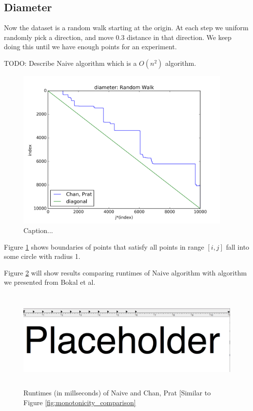 \documentclass{article}
\begin{document}
\subsection{Diameter}

Now the dataset is a random walk starting at the origin. At each step we uniform randomly pick a direction, and move 0.3 distance in that direction. We keep doing this until we have enough points for an experiment.

TODO: Describe Naive algorithm which is a $O(n^2)$ algorithm.

\begin{figure}[!h]
  \centering
  \includegraphics[height=8cm]{plots/diameter_random_walk}
  \caption{Caption...}
  \label{fig:diameter_demo}
\end{figure}

Figure \ref{fig:diameter_demo} shows boundaries of points that satisfy all points in range $[i, j]$ fall into some circle with radius 1.

Figure \ref{fig:diameter_comparison} will show results comparing runtimes of Naive algorithm with algorithm we presented from Bokal et al.
\begin{figure}[!ht]
  \centering
  \includegraphics[height=5cm]{plots/diameter_comparison}
  \caption{Runtimes (in millseconds) of Naive and Chan, Prat [Similar to Figure \ref{fig:monotonicity_comparison}}
  \label{fig:diameter_comparison}
\end{figure}
\end{document}
